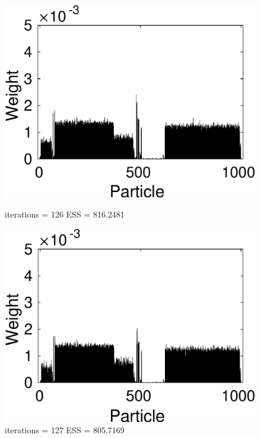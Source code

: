 \documentclass[12pt]{article}
\begin{document}
\begin{figure}[h!]
\centering
	\begin{minipage}{0.5\textwidth}
		\centering
		\includegraphics[scale = 0.5]{./Figures/126.eps}
		\caption*{iterations = 126 ESS = 816.2481}
	\end{minipage}%
	\begin{minipage}{0.5\textwidth}
		\centering
		\includegraphics[scale = 0.5]{./Figures/127.eps}
		\caption*{iterations = 127 ESS = 805.7169}
	\end{minipage}
	\begin{minipage}{0.5\textwidth}
		\centering

\end{minipage}
\end{figure}
\end{document}
